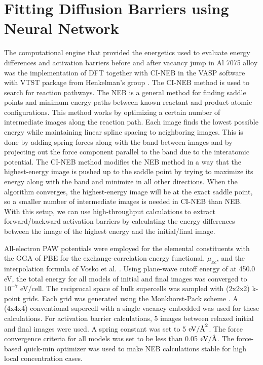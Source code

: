 \section{Fitting Diffusion Barriers using Neural Network}
\label{Chap:Al/Vac:section:NN}

The computational engine that provided the energetics used to evaluate energy differences and activation barriers before and after vacancy jump in Al 7075 alloy was the implementation of \ac{DFT} together with \acf{CI-NEB} in the \ac{VASP} software with VTST package from Henkelman's group \cite{henkelman2000climbing,henkelman2000improved}.
The \ac{CI-NEB} method is used to search for reaction pathways. The \acf{NEB} is a general method for finding saddle points and minimum energy paths between known reactant and product atomic configurations. This method works by optimizing a certain number of intermediate images along the reaction path. Each image finds the lowest possible energy while maintaining linear spline spacing to neighboring images. This is done by adding spring forces along with the band between images and by projecting out the force component parallel to the band due to the interatomic potential. The \ac{CI-NEB} method modifies the \ac{NEB} method in a way that the highest-energy image is pushed up to the saddle point by trying to maximize its energy along with the band and minimize in all other directions. When the algorithm converges, the highest-energy image will be at the exact saddle point, so a smaller number of intermediate images is needed in \ac{CI-NEB} than \ac{NEB}. With this setup, we can use high-throughput calculations to extract forward/backward activation barriers by calculating the energy differences between the image of the highest energy and the initial/final image.


All-electron \ac{PAW} potentials were employed for the elemental constituents with the \ac{GGA} of \ac{PBE} for the exchange-correlation energy functional, $\mu_{xc}$, and the interpolation formula of Vosko et al. \cite{vosko1980accurate}. Using plane-wave cutoff energy of at 450.0 eV, the total energy for all models of initial and final images was converged to $10^{−7}$ eV/cell. The reciprocal space of bulk supercells was sampled with (2x2x2) k-point grids. Each grid was generated using the Monkhorst-Pack scheme \cite{monkhorst1976special}. A (4x4x4) conventional supercell with a single vacancy embedded was used for these calculations. For activation barrier calculations, 5 images between relaxed initial and final images were used. A spring constant was set to 5 $\text{eV}/\mbox{\normalfont\AA}^2$. The force convergence criteria for all models was set to be less than 0.05 $\text{eV}/\mbox{\normalfont\AA}$. The force-based quick-min optimizer was used to make \ac{NEB} calculations stable for high local concentration cases. \cite{sheppard2008optimization}


